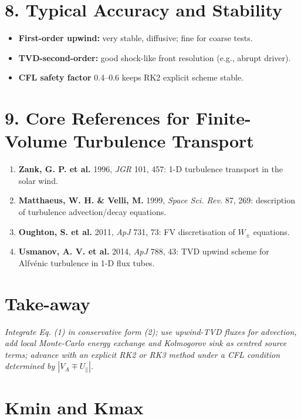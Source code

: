 \hrulefill

\section*{8. Typical Accuracy and Stability}

\begin{itemize}
    \item \textbf{First-order upwind:} very stable, diffusive; fine for coarse tests.
    \item \textbf{TVD-second-order:} good shock-like front resolution (e.g., abrupt driver).
    \item \textbf{CFL safety factor} 0.4–0.6 keeps RK2 explicit scheme stable.
\end{itemize}

\hrulefill

\section*{9. Core References for Finite-Volume Turbulence Transport}

\begin{enumerate}
    \item \textbf{Zank, G. P. et al.} 1996, \textit{JGR} 101, 457: 1-D turbulence transport in the solar wind.
    \item \textbf{Matthaeus, W. H. \& Velli, M.} 1999, \textit{Space Sci. Rev.} 87, 269: description of turbulence advection/decay equations.
    \item \textbf{Oughton, S. et al.} 2011, \textit{ApJ} 731, 73: FV discretisation of $W_\pm$ equations.
    \item \textbf{Usmanov, A. V. et al.} 2014, \textit{ApJ} 788, 43: TVD upwind scheme for Alfvénic turbulence in 1-D flux tubes.
\end{enumerate}

\hrulefill

\section*{Take-away}

\textit{Integrate Eq. (1) in conservative form (2); use upwind-TVD fluxes for advection, add local Monte-Carlo energy exchange and Kolmogorov sink as centred source terms; advance with an explicit RK2 or RK3 method under a CFL condition determined by $|V_A \mp U_\parallel|$.}


\section{Kmin and Kmax}


